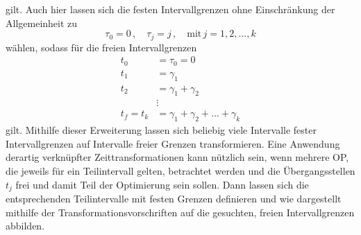gilt. Auch hier lassen sich die festen Intervallgrenzen ohne Einschränkung der Allgemeinheit zu
\begin{equation}
	\tau_0 = 0\,, \quad\tau_j = j\,, \quad\textrm{mit}\, j=1,2,...,k
\end{equation}
wählen, sodass für die freien Intervallgrenzen 
\begin{align}
t_0 &= \tau_0 = 0\\
t_1 &= \gamma_1 \\
t_2 &= \gamma_1+\gamma_2 \\
&\vdots\\
t_f = t_k &= \gamma_1+\gamma_2+\dots+\gamma_k
\end{align}
gilt. Mithilfe dieser Erweiterung lassen sich beliebig viele Intervalle fester Intervallgrenzen auf Intervalle freier Grenzen transformieren. Eine Anwendung derartig verknüpfter Zeittransformationen kann nützlich sein, wenn mehrere \gls{OP}, die jeweils für ein Teilintervall gelten, betrachtet werden und die Übergangsstellen $t_j$ frei und damit Teil der Optimierung sein sollen. Dann lassen sich die entsprechenden Teilintervalle mit festen Grenzen definieren und wie dargestellt mithilfe der Transformationsvorschriften auf die gesuchten, freien Intervallgrenzen abbilden.
